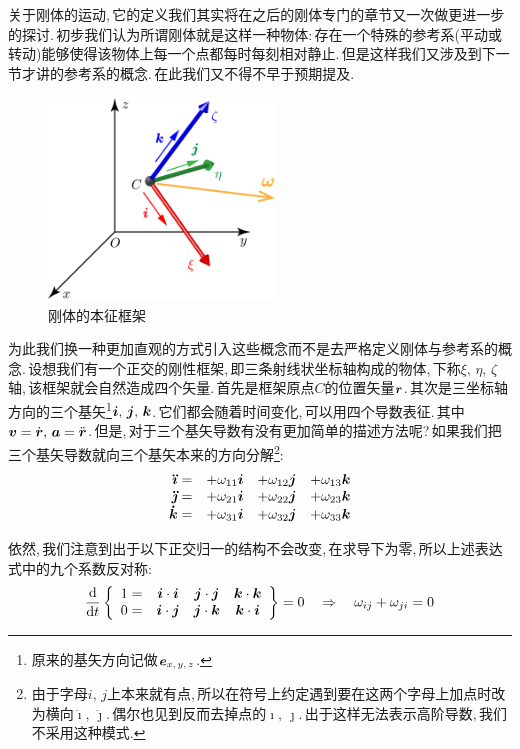 关于刚体的运动,\,它的定义我们其实将在之后的刚体专门的章节又一次做更进一步的探讨.\,初步我们认为所谓刚体就是这样一种物体:\,存在一个特殊的参考系(平动或转动)能够使得该物体上每一个点都每时每刻相对静止.\,但是这样我们又涉及到下一节才讲的参考系的概念.\,在此我们又不得不早于预期提及.

\begin{figure}\label{6-1-8}
\vspace{-0.2cm}
\centering
\includegraphics[width=6cm]{image/6-1-8.png}
\caption{刚体的本征框架}
\end{figure}
为此我们换一种更加直观的方式引入这些概念而不是去严格定义刚体与参考系的概念.\,设想我们有一个正交的刚性框架,\,即三条射线状坐标轴构成的物体,\,下称$\xi,\,\eta,\,\zeta$轴,\,该框架就会自然造成四个矢量.\,首先是框架原点$C$的位置矢量$\boldsymbol{r}$.\,其次是三坐标轴方向的三个基矢\footnote{原来的基矢方向记做$\boldsymbol{e}_{x,\,y,\,z}$.}$\boldsymbol{i},\,\boldsymbol{j},\,\boldsymbol{k}$.\,它们都会随着时间变化,\,可以用四个导数表征.\,其中$\boldsymbol{v}=\dot{\boldsymbol{r}},\,\boldsymbol{a}=\ddot{\boldsymbol{r}}$.\,但是,\,对于三个基矢导数有没有更加简单的描述方法呢?\,如果我们把三个基矢导数就向三个基矢本来的方向分解\footnote{由于字母$i,\,j$上本来就有点,\,所以在符号上约定遇到要在这两个字母上加点时改为横向$\ddot{\imath},\,\ddot{\jmath}$.\,偶尔也见到反而去掉点的$\imath,\,\jmath$.\,出于这样无法表示高阶导数,\,我们不采用这种模式.}:
\[\begin{array}{rlll}
\boldsymbol{\ddot{\imath}}=		&	+\omega_{11}\boldsymbol{i} 	&	+\omega_{12}\boldsymbol{j} 		& +\omega_{13}\boldsymbol{k}\\
\boldsymbol{\ddot{\jmath}}=		&	+\omega_{21}\boldsymbol{i} 	&	+\omega_{22}\boldsymbol{j} 		& +\omega_{23}\boldsymbol{k}\\
\boldsymbol{\dot{k}}=				&	+\omega_{31}\boldsymbol{i} 	&	+\omega_{32}\boldsymbol{j} 		& +\omega_{33}\boldsymbol{k}
\end{array}\]

依然,\,我们注意到出于以下正交归一的结构不会改变,\,在求导下为零,\,所以上述表达式中的九个系数反对称:
\[\frac{\textrm{d}}{\textrm{d} t}\left\{\begin{array}{cccc}
1= 	&\boldsymbol{i}\cdot\boldsymbol{i} 	&\boldsymbol{j}\cdot\boldsymbol{j} 	&\boldsymbol{k}\cdot\boldsymbol{k} 	\\
0= 	&\boldsymbol{i}\cdot\boldsymbol{j} 	&\boldsymbol{j}\cdot\boldsymbol{k} 	&\boldsymbol{k}\cdot\boldsymbol{i}
\end{array}\right\}=0\quad \Rightarrow \quad\omega_{ij}+\omega_{ji}=0\]

